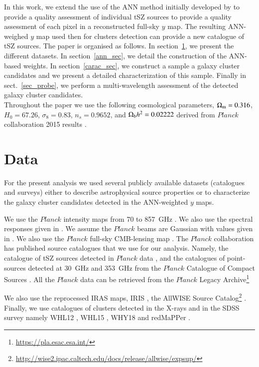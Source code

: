 \documentclass[traditabstract,a4,twocolumn]{aa}
\begin{document}
In this work, we extend the use of the ANN method initially developed by \cite{agh14} to provide a quality assessment of individual tSZ sources to provide a quality assessment of each pixel in a reconstructed full-sky $y$ map. The resulting ANN-weighed $y$ map used then for clusters detection can provide a new catalogue of tSZ sources. The paper is organised as follows. In section~\ref{sec_data}, we present the different datasets. In section~\ref{ann_sec}, we detail the construction of the ANN-based weights. In
section~\ref{carac_sec}, we construct a sample a galaxy cluster
candidates and we present a detailed characterization of this sample. Finally in sect.~\ref{sec_probe}, we perform a multi-wavelength assessment of the detected galaxy cluster candidates.\\

Throughout the paper we use the following cosmological parameters, $\Omega_{\rm m} = 0.316$, $H_0 = 67.26$, $\sigma_8 = 0.83$, $n_s = 0.9652$, and $\Omega_{\rm b}h^2 = 0.02222$ derived from $Planck$ collaboration 2015 results \citep{planck2015cosmo}.

\section{Data}
\label{sec_data}

For the present analysis we used several publicly available datasets (catalogues and surveys) either to describe astrophysical source properties or to characterize the galaxy cluster candidates detected in the ANN-weighted $y$ maps.

We use the {\it $Planck$} intensity maps from 70 to 857~GHz \citep{PlanckMIS}. We also use the spectral responses given in \citet{planckRESP}. We assume the {\it $Planck$} beams are Gaussian with values given in \citep{planckBEAM}. We also use the {\it $Planck$} full-sky CMB-lensing map \citep{plcklens}. The {\it $Planck$} collaboration has published source catalogues that we use for our analysis. Namely, the catalogue of tSZ sources detected in {\it $Planck$} data \citep[PSZ2 hereafter, see ][]{PSZ2}, and the catalogues of point-sources detected at 30~GHz and 353~GHz from the $Planck$ Catalogue of Compact Sources \citep{planck2013-p05}. All the {\it $Planck$} data can be retrieved from the $Planck$ Legacy Archive\footnote{\url{https://pla.esac.esa.int/}}

We also use the reprocessed IRAS maps, IRIS \citep[Improved Reprocessing of the IRAS Survey,][]{miv05}, the AllWISE Source Catalog\footnote{\url{http://wise2.ipac.caltech.edu/docs/release/allwise/expsup/}} \citep{wri10,mai11}. Finally, we use catalogues of clusters detected in the X-rays \citep[MCXC,][and reference therein]{pif11} and in the SDSS survey namely WHL12 \citep{wen12}, WHL15 \citep{wen15}, WHY18 \citep{wen18} and redMaPPer \citep{ryk13}.
\end{document}
